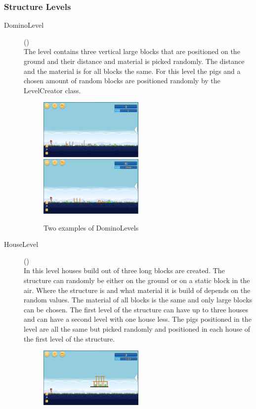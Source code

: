 \subsubsection{Structure Levels}
\begin{description}
	\item[DominoLevel]()\\
		The level contains three vertical large blocks that are positioned on the ground and their distance and material is picked randomly. The distance and the material is for all blocks the same. For this level the pigs and a chosen amount of random blocks are positioned randomly by the LevelCreator class.
		\begin{figure}[tbh!]
			\includegraphics[width=0.5\textwidth]{img/DominoLevel.png}
			\includegraphics[width=0.5\textwidth]{img/DominoLevel2.png}
			\caption{Two examples of DominoLevels}
		\end{figure}
	\item[HouseLevel]()\\
		In this level houses build out of three long blocks are created. The structure can randomly be either on the ground or on a static block in the air. Where the structure is and what material it is build of depends on the random values. The material of all blocks is the same and only large blocks can be chosen. The first level of the structure can have up to three houses and can have a second level with one house less. The pigs positioned in the level are all the same but picked randomly and positioned in each house of the first level of the structure.
		\begin{figure}[tbh!]
		\includegraphics[width=0.5\textwidth]{img/HouseLevel.png}

\end{figure}
\end{description}
